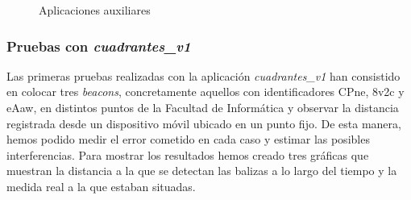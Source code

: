 \begin{figure}
	\centering
	\caption{Aplicaciones auxiliares}
	\label{f:apps}
\end{figure}

\subsubsection{Pruebas con \textit{cuadrantes\_v1}}
\label{sub:pruebasCuadrantesv1}

Las primeras pruebas realizadas con la aplicación \textit{cuadrantes\_v1} han consistido en colocar tres \textit{beacons}, concretamente aquellos con identificadores CPne, 8v2c y eAaw, en distintos puntos de la Facultad de Informática y observar la distancia registrada desde un dispositivo móvil ubicado en un punto fijo. De esta manera, hemos podido medir el error cometido en cada caso y estimar las posibles interferencias. Para mostrar los resultados hemos creado tres gráficas que muestran la distancia a la que se detectan las balizas a lo largo del tiempo y la medida real a la que estaban situadas. 


